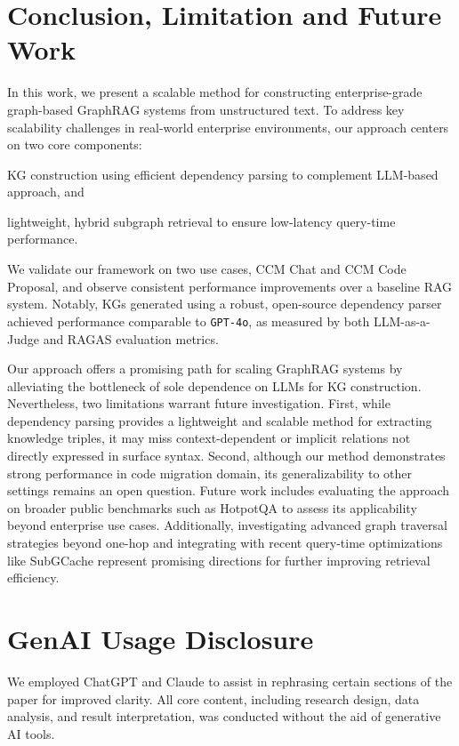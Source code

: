 \documentclass[runningheads]{llncs}
\begin{document}
\section{Conclusion, Limitation and Future Work}
In this work, we present a scalable method for constructing enterprise-grade graph-based GraphRAG systems from unstructured text. To address key scalability challenges in real-world enterprise environments, our approach centers on two core components: \begin{inparaenum}[(i)]
    \item KG construction using efficient dependency parsing to complement LLM-based approach, and \item lightweight, hybrid subgraph retrieval to ensure low-latency query-time performance. \end{inparaenum} We validate our framework on two use cases, CCM Chat and CCM Code Proposal, and observe consistent performance improvements over a baseline RAG system. Notably, KGs generated using a robust, open-source dependency parser achieved performance comparable to \texttt{GPT-4o}, as measured by both LLM-as-a-Judge and RAGAS evaluation metrics.

Our approach offers a promising path for scaling GraphRAG systems by alleviating the bottleneck of sole dependence on LLMs for KG construction. Nevertheless, two limitations warrant future investigation. First, while dependency parsing provides a lightweight and scalable method for extracting knowledge triples, it may miss context-dependent or implicit relations not directly expressed in surface syntax. Second, although our method demonstrates strong performance in code migration domain, its generalizability to other settings remains an open question. Future work includes evaluating the approach on broader public benchmarks such as HotpotQA to assess its applicability beyond enterprise use cases. Additionally, investigating advanced graph traversal strategies beyond one-hop and integrating with recent query-time optimizations like SubGCache represent promising directions for further improving retrieval efficiency.

\section{GenAI Usage Disclosure}
We employed ChatGPT and Claude to assist in rephrasing certain sections of the paper for improved clarity. All core content, including research design, data analysis, and result interpretation, was conducted without the aid of generative AI tools.


\end{document}
